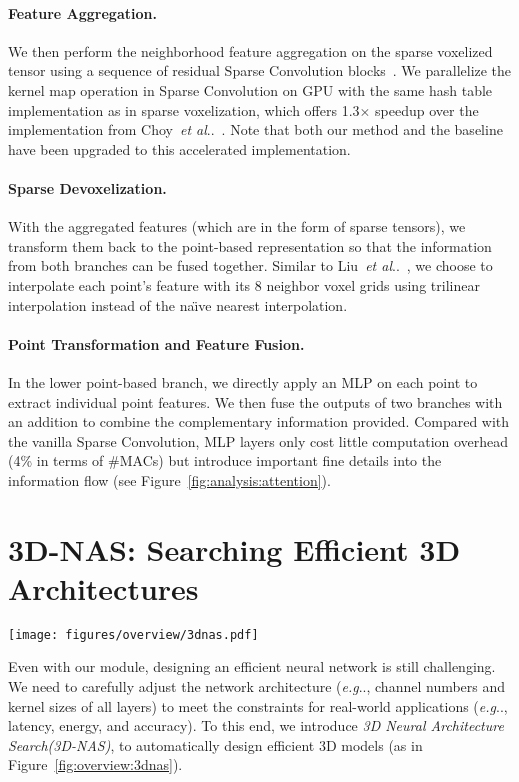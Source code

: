 \documentclass[runningheads]{llncs}
\makeatletter
\newcommand{\fig}[1]{Figure~\ref{#1}}
\def\naive{na\"{\i}ve\xspace}
\DeclareRobustCommand\onedot{\futurelet\@let@token\@onedot}
\def\@onedot{\ifx\@let@token.\else.\null\fi\xspace}
\def\eg{\emph{e.g}\onedot} \def\Eg{\emph{E.g}\onedot}
\def\etal{\emph{et al}\onedot}
\def\moduleshort{SPVConv\xspace}
\def\nas{3D Neural Architecture Search\xspace}
\def\nasshort{3D-NAS\xspace}
\makeatother
\begin{document}
\paragraph{Feature Aggregation.}

We then perform the neighborhood feature aggregation on the sparse voxelized tensor using a sequence of residual Sparse Convolution blocks~\cite{choy20194d}. We parallelize the kernel map operation in Sparse Convolution on GPU with the same hash table implementation as in sparse voxelization, which offers 1.3$\times$ speedup over the implementation from Choy~\etal~\cite{choy20194d}. Note that both our method and the baseline have been upgraded to this accelerated implementation.

\paragraph{Sparse Devoxelization.}

With the aggregated features (which are in the form of sparse tensors), we transform them back to the point-based representation so that the information from both branches can be fused together. Similar to Liu~\etal~\cite{liu2019point}, we choose to interpolate each point's feature with its 8 neighbor voxel grids using trilinear interpolation instead of the \naive nearest interpolation.

\paragraph{Point Transformation and Feature Fusion.}

In the lower point-based branch, we directly apply an MLP on each point to extract individual point features. We then fuse the outputs of two branches with an addition to combine the complementary information provided. Compared with the vanilla Sparse Convolution, MLP layers only cost little computation overhead (4\% in terms of \#MACs) but introduce important fine details into the information flow (see \fig{fig:analysis:attention}).

\section{\nasshort: Searching Efficient 3D Architectures}

\begin{figure*}[t]
\centering
\texttt{[image: figures/overview/3dnas.pdf]}
\caption{Overview of \nas (\nasshort): we first train a super network composed of multiple \moduleshort's, supporting fine-grained channel numbers and elastic network depths. Then, we perform the evolutionary architecture search to obtain the best candidate model under a given computation constraint.}
\label{fig:overview:3dnas}
\end{figure*} 
Even with our module, designing an efficient neural network is still challenging. We need to carefully adjust the network architecture (\eg, channel numbers and kernel sizes of all layers) to meet the constraints for real-world applications (\eg, latency, energy, and accuracy). To this end, we introduce \emph{\nas (\nasshort)}, to automatically design efficient 3D models (as in \fig{fig:overview:3dnas}).
\end{document}
